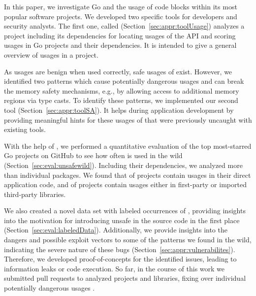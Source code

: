 In this paper, we investigate Go and the usage of \unsafe{} code blocks within its most popular software projects. 
We developed two specific tools for developers and security analysts.
The first one, called \toolUsage{} (Section~\ref{sec:appr:toolUsage}) analyzes a project including its dependencies for locating usages of the \unsafe{} API and scoring \unsafe{} usages in Go projects and their dependencies. 
It is intended to give a general overview of \unsafe{} usages in a project. %

As \unsafe{} usages are benign when used correctly, safe usages of \unsafe{} exist.
However, we identified two patterns which cause potentially dangerous \unsafe{} usages and can break the memory safety mechanisms, e.g., by allowing access to additional memory regions via type casts.
To identify these patterns, we implemented our second tool \toolSA{} (Section~\ref{sec:appr:toolSA}).
It helps during application development by providing meaningful hints for these usages of \unsafe{} that were previously uncaught with existing tools.

With the help of \toolUsage{}, we performed a quantitative evaluation of the top \initalProjs{} most-starred Go projects on GitHub to see how often \unsafe{} is used in the wild (Section~\ref{sec:eval:unsafewild}). 
Including their dependencies, we analyzed more than \packagesAnalyzedRounded{} individual packages. %
We found that \percentageProjectsWithUnsafe{} of projects contain \unsafe{} usages in their direct application code, and \percentageProjectsAndDependenciesUnsafe{} of
projects contain \unsafe{} usages either in first-party or imported third-party libraries.

We also created a novel data set with  labeled occurrences of \unsafe{}, providing insights into the motivation for introducing unsafe in the source code in the first place (Section~\ref{sec:eval:labeledData}). 
Additionally, we provide insights into the dangers and possible exploit vectors to some of the patterns we found in the wild, indicating the severe nature of these bugs (Section~\ref{sec:appr:vulnerabilites}). 
Therefore, we developed proof-of-concepts for the identified issues, leading to information leaks or code execution.
So far, in the course of this work we submitted \numberPRs{} pull requests to analyzed projects and libraries, fixing over \numberBugsFixed{} individual potentially dangerous \unsafe{} usages .

